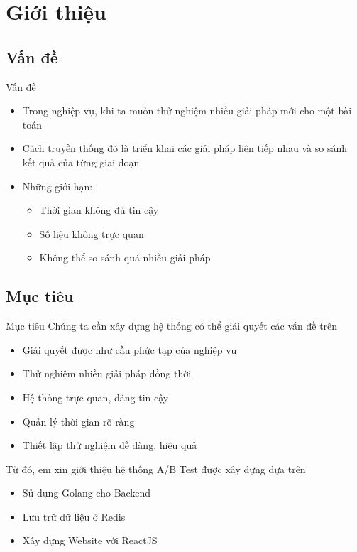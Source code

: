 \section{Giới thiệu}

\subsection{Vấn đề}

\begin{frame}{Vấn đề}
	\begin{itemize}
		\item Trong nghiệp vụ, khi ta muốn thử nghiệm nhiều giải pháp mới cho một bài toán
		\item Cách truyền thống đó là triển khai các giải pháp liên tiếp nhau và so sánh kết quả của từng giai đoạn
		\item Những giới hạn:
		      \begin{itemize}
			      \item Thời gian không đủ tin cậy
			      \item Số liệu không trực quan
			      \item Không thể so sánh quá nhiều giải pháp
		      \end{itemize}
	\end{itemize}
\end{frame}

\subsection{Mục tiêu}

\begin{frame}{Mục tiêu}
	Chúng ta cần xây dựng hệ thống có thể giải quyết các vấn đề trên
	\begin{itemize}
		\item Giải quyết được như cầu phức tạp của nghiệp vụ
		\item Thử nghiệm nhiều giải pháp đồng thời
		\item Hệ thống trực quan, đáng tin cậy
		\item Quản lý thời gian rõ ràng
		\item Thiết lập thử nghiệm dễ dàng, hiệu quả
	\end{itemize}
	Từ đó, em xin giới thiệu hệ thống A/B Test được xây dựng dựa trên
	\begin{itemize}
		\item Sử dụng Golang cho Backend
		\item Lưu trữ dữ liệu ở Redis
		\item Xây dựng Website với ReactJS
	\end{itemize}
\end{frame}
